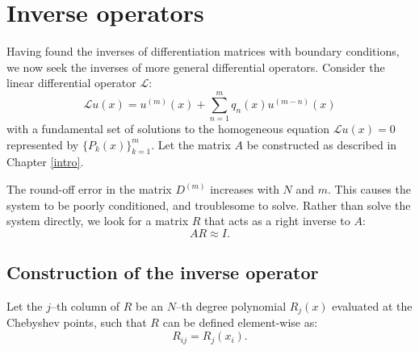 \documentclass{sfuthesis}
\begin{document}


\chapter{Inverse operators} \label{sec:inv}

Having found the inverses of differentiation matrices with boundary conditions, we now seek the inverses of more general differential operators.
Consider the linear differential operator $\mathcal{L}$:
\begin{equation}
\mathcal{L} u(x) = u^{(m)}(x) + \sum_{n = 1}^m q_n(x) u^{(m-n)}(x)
\end{equation}
with a fundamental set of solutions to the homogeneous equation $\mathcal{L} u(x) = 0$ represented by $\{ P_k(x) \}_{k=1}^m$.
Let the matrix $A$ be constructed as described in Chapter \ref{intro}.

The round-off error in the matrix $D^{(m)}$ increases with $N$ and $m$.
This causes the system to be poorly conditioned, and troublesome to solve.
Rather than solve the system directly, we look for a matrix $R$ that acts as a right inverse to $A$:
\begin{equation}
A R \approx I.
\end{equation}

\section{Construction of the inverse operator}

Let the $j$--th column of $R$ be an $N$--th degree polynomial $R_j(x)$ evaluated at the Chebyshev points, such that $R$ can be defined element-wise as:
\begin{equation}
R_{ij} = R_j(x_i) .
\end{equation}
\end{document}
